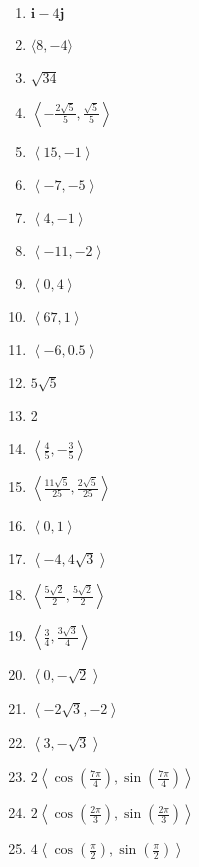 \begin{multicols}{3}
\begin{enumerate}
	\item $\mathbf{i}-4\mathbf{j}$
    \item $\langle 8, -4 \rangle$
    \item $\sqrt{34}$
    \item $\left\langle -\frac{2\sqrt{5}}{5}, \frac{\sqrt{5}}{5}\right\rangle$
    \item $\left\langle 15, -1\right\rangle$
    \item $\left\langle -7, -5 \right\rangle$
    \item $\left\langle 4, -1 \right\rangle$
    \item $\left\langle -11, -2 \right\rangle$
    \item $\left\langle 0, 4 \right\rangle$
    \item $\left\langle 67, 1 \right\rangle$
    \item $\left\langle -6, 0.5 \right\rangle$
    \item $5\sqrt{5}$
    \item 2
    \item $\left\langle \frac{4}{5}, -\frac{3}{5}\right\rangle$
    \item $\left\langle \frac{11\sqrt{5}}{25}, \frac{2\sqrt{5}}{25}\right\rangle$
    \item $\left\langle 0, 1\right\rangle$
    \item $\left\langle -4, 4\sqrt{3}\right\rangle$
    \item $\left\langle \frac{5\sqrt{2}}{2}, \frac{5\sqrt{2}}{2} \right\rangle$
    \item $\left\langle \frac{3}{4}, \frac{3\sqrt{3}}{4}\right\rangle$
    \item $\left\langle 0, -\sqrt{2} \right\rangle$
    \item $\left\langle -2\sqrt{3}, -2 \right\rangle$
    \item $\left\langle 3, -\sqrt{3} \right\rangle$
    \item $2\left\langle \cos\left(\frac{7\pi}{4}\right), \sin\left(\frac{7\pi}{4}\right) \right\rangle$
    \item $2\left\langle \cos\left(\frac{2\pi}{3}\right), \sin\left(\frac{2\pi}{3}\right) \right\rangle$
    \item $4\left\langle \cos\left(\frac{\pi}{2}\right), \sin\left(\frac{\pi}{2}\right) \right\rangle$
\end{enumerate}
\end{multicols}